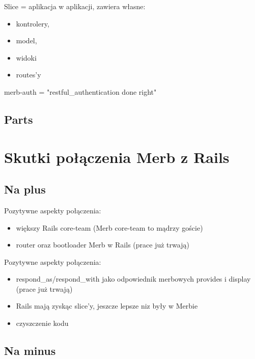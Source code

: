 \documentclass[19pt]{beamer}
\begin{document}
\begin{center}
\begin{frame}
Slice = aplikacja w aplikacji, zawiera własne:
\begin{itemize}
\item kontrolery, 
\item model, 
\item widoki 
\item routes'y
\end{itemize}
\end{frame}

\begin{frame}
merb-auth = "restful\_authentication done right"
\end{frame}

\subsection{Parts}

\section{Skutki połączenia Merb z Rails}
\subsection{Na plus}

\begin{frame}
Pozytywne aspekty połączenia:
\begin{itemize}
\item większy Rails core-team (Merb core-team to mądrzy goście)
\item router oraz bootloader Merb w Rails (prace już trwają)
\end{itemize}
\end{frame}

\begin{frame}
Pozytywne aspekty połączenia:
\begin{itemize}
\item respond\_as/respond\_with jako odpowiednik merbowych provides i display (prace już trwają)
\item Rails mają zyskąc slice'y, jeszcze lepsze niz były w Merbie
\item czyszczenie kodu
\end{itemize}
\end{frame}

\subsection{Na minus}


\end{center}
\end{document}
